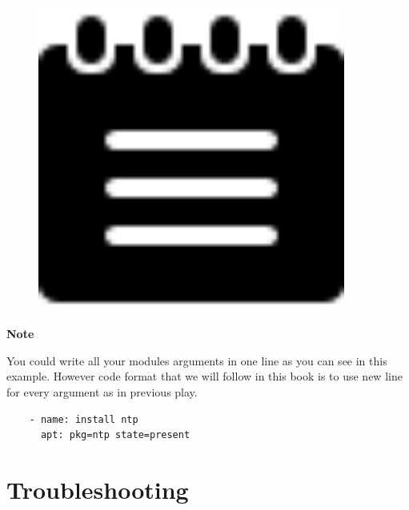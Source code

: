 \documentclass[10pt]{book}
\begin{document}
\begin{mdframed}[style=noteStyle]
\begin{minipage}[b]{0.05\textwidth}
\begin{figure}[H]
\includegraphics[width=0.9\textwidth]{figures/notes-icon.png} 
\end{figure}
\end{minipage}  
\begin{minipage}[b]{0.05\textwidth}
\textbf{Note}
\end{minipage}

You could write all your modules arguments in one line as you can see in this example. 
However code format that we will follow in this book is to use new line for every argument 
as in previous play.

\begin{Verbatim} 
    - name: install ntp
      apt: pkg=ntp state=present
\end{Verbatim}

\end{mdframed}



\section{Troubleshooting}
\end{document}
